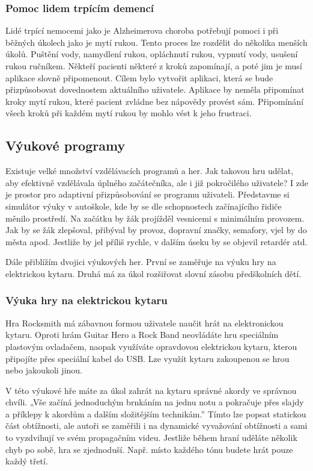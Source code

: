 \subsubsection{Pomoc lidem trpícím demencí}

Lidé trpící nemocemi jako je Alzheimerova choroba potřebují pomoci i při běžných úkolech jako je mytí rukou. Tento proces lze rozdělit do několika menších úkolů. Puštění vody, namydlení rukou, opláchnutí rukou, vypnutí vody, usušení rukou ručníkem. Někteří pacienti některé z kroků zapomínají, a poté jim je musí aplikace slovně připomenout. Cílem bylo vytvořit aplikaci, která se bude přizpůsobovat dovednostem aktuálního uživatele. Aplikace by neměla připomínat kroky mytí rukou, které pacient zvládne bez nápovědy provést sám. Připomínání všech kroků při každém mytí rukou by mohlo vést k jeho frustraci\cite{10Dementia}.  

\subsection{Výukové programy}

Existuje velké množství vzdělávacích programů a her. Jak takovou hru udělat, aby efektivně vzdělávala úplného začátečníka, ale i již pokročilého uživatele? I zde je prostor pro adaptivní přizpůsobování se programu uživateli. Představme si simulátor výuky v autoškole, kde by se dle schopnostech začínajícího řidiče měnilo prostředí. Na začátku by žák projížděl vesnicemi s minimálním provozem. Jak by se žák zlepšoval, přibýval by provoz, dopravní značky, semafory, vjel by do města apod. Jestliže by jel příliš rychle, v dalším úseku by se objevil retardér atd.

Dále přiblížím dvojici výukových her. První se zaměřuje na výuku hry na elektrickou kytaru. Druhá má za úkol rozšiřovat slovní zásobu předškolních dětí.

\subsubsection{Výuka hry na elektrickou kytaru}

Hra Rocksmith má zábavnou formou uživatele naučit hrát na elektronickou kytaru. Oproti hrám Guitar Hero a Rock Band neovládáte hru speciálním plastovým ovladačem, naopak využíváte opravdovou elektrickou kytaru, kterou připojíte přes speciální kabel do USB. Lze využít kytaru zakoupenou se hrou nebo jakoukoli jinou.

V této výukové hře máte za úkol zahrát na kytaru správné akordy ve správnou chvíli. „Vše začíná jednoduchým brnkáním na jednu notu a pokračuje přes slajdy a příklepy k akordům a dalším složitějším technikám.”\cite{12RocksmithRev} Tímto lze popsat statickou část obtížnosti, ale autoři se zaměřili i na dynamické vyvažování obtížnosti a sami to vyzdvihují ve svém propagačním videu\cite{13RocksmithVid}. Jestliže během hraní uděláte několik chyb po sobě, hra se zjednoduší. Např. místo každého tónu budete hrát pouze každý třetí.

